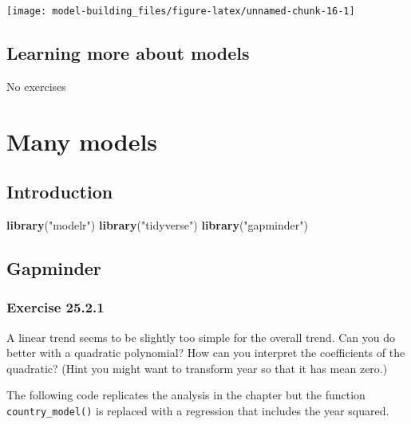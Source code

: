 \documentclass[]{book}
\newenvironment{Shaded}{\begin{snugshade}}{\end{snugshade}}
\newcommand{\KeywordTok}[1]{\textcolor[rgb]{0.13,0.29,0.53}{\textbf{#1}}}
\newcommand{\NormalTok}[1]{#1}
\newcommand{\StringTok}[1]{\textcolor[rgb]{0.31,0.60,0.02}{#1}}
\theoremstyle{plain}
\theoremstyle{remark}
\begin{document}
\begin{center}\texttt{[image: model-building\_files/figure-latex/unnamed-chunk-16-1]} \end{center}

\hypertarget{learning-more-about-models}{%
\section{Learning more about models}\label{learning-more-about-models}}

No exercises

\hypertarget{many-models}{%
\chapter{Many models}\label{many-models}}

\hypertarget{introduction-16}{%
\section{Introduction}\label{introduction-16}}

\begin{Shaded}
\begin{Highlighting}[]
\KeywordTok{library}\NormalTok{(}\StringTok{"modelr"}\NormalTok{)}
\KeywordTok{library}\NormalTok{(}\StringTok{"tidyverse"}\NormalTok{)}
\KeywordTok{library}\NormalTok{(}\StringTok{"gapminder"}\NormalTok{)}
\end{Highlighting}
\end{Shaded}

\hypertarget{gapminder}{%
\section{Gapminder}\label{gapminder}}

\hypertarget{exercise-25.2.1}{%
\subsection*{\texorpdfstring{Exercise
{25.2.1}}{Exercise 25.2.1}}\label{exercise-25.2.1}}

A linear trend seems to be slightly too simple for the overall trend.
Can you do better with a quadratic polynomial? How can you interpret the
coefficients of the quadratic? (Hint you might want to transform year so
that it has mean zero.)

The following code replicates the analysis in the chapter but the
function \texttt{country\_model()} is replaced with a regression that
includes the year squared.
\end{document}
